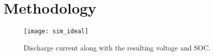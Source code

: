 \chapter{Methodology}


\begin{figure}
\centering
\texttt{[image: sim\_ideal]}
\caption{Discharge current along with the resulting voltage and SOC.}
\label{fig:idealsim}
\end{figure}
